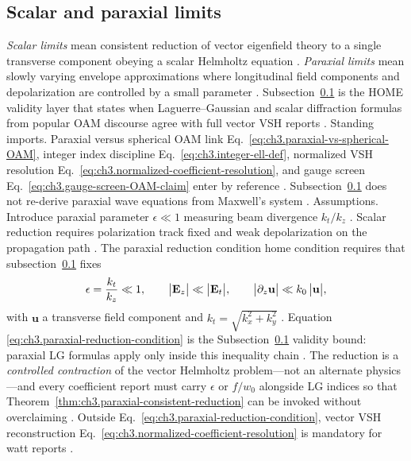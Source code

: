 \subsection{Scalar and paraxial limits}
\label{sec:ch393}
\emph{Scalar limits} mean consistent reduction of vector eigenfield theory to a single transverse component obeying a scalar Helmholtz
equation \cite{jackson1999}. \emph{Paraxial limits} mean slowly varying envelope approximations where
longitudinal field components and depolarization are controlled by a small parameter \cite{allen1992}. Subsection~\ref{sec:ch393}
is the HOME validity layer that states when Laguerre--Gaussian and scalar diffraction formulas from popular OAM discourse agree with full
vector VSH reports \cite{allen1992}.
Standing imports. Paraxial versus spherical OAM link Eq.~\eqref{eq:ch3.paraxial-vs-spherical-OAM}, integer index discipline
Eq.~\eqref{eq:ch3.integer-ell-def}, normalized VSH resolution Eq.~\eqref{eq:ch3.normalized-coefficient-resolution}, and gauge screen
Eq.~\eqref{eq:ch3.gauge-screen-OAM-claim} enter by reference \cite{allen1992}. Subsection~\ref{sec:ch393} does not
re-derive paraxial wave equations from Maxwell's system \cite{stratton1941}.
Assumptions. Introduce paraxial parameter \(\epsilon\ll1\) measuring beam divergence \(k_{t}/k_{z}\) \cite{jackson1999}. Scalar reduction
requires polarization track fixed and weak depolarization on the propagation path \cite{stratton1941}.
The paraxial reduction condition home condition requires that subsection~\ref{sec:ch393} fixes
\begin{equation}
\label{eq:ch3.paraxial-reduction-condition}
\epsilon
=
\frac{k_{t}}{k_{z}}
\ll 1,
\qquad
\bigl|\mathbf{E}_{z}\bigr|\ll \bigl|\mathbf{E}_{t}\bigr|,
\qquad
\bigl|\partial_{z}\mathbf{u}\bigr|\ll k_{0}\,\bigl|\mathbf{u}\bigr|,
\end{equation}
with \(\mathbf{u}\) a transverse field component and \(k_{t}=\sqrt{k_{x}^{2}+k_{y}^{2}}\) \cite{jackson1999}. Equation
\eqref{eq:ch3.paraxial-reduction-condition} is the Subsection~\ref{sec:ch393} validity bound: paraxial LG formulas apply only inside this
inequality chain \cite{allen1992}. The reduction is a \emph{controlled contraction} of the vector Helmholtz problem---not an alternate
physics---and every coefficient report must carry \(\epsilon\) or \(f/w_{0}\) alongside LG indices so that Theorem~\ref{thm:ch3.paraxial-consistent-reduction}
can be invoked without overclaiming \cite{allen1992}. Outside Eq.~\eqref{eq:ch3.paraxial-reduction-condition}, vector VSH
reconstruction Eq.~\eqref{eq:ch3.normalized-coefficient-resolution} is mandatory for watt reports \cite{hansen1988}.
